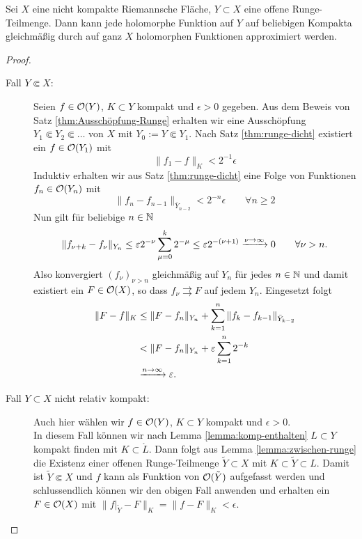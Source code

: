\begin{thm}
  \label{thm:runge}
  Sei $X$ eine nicht kompakte Riemannsche Fläche, $Y \subset X$ eine
  offene Runge-Teilmenge.
  Dann kann jede holomorphe Funktion auf $Y$ auf beliebigen Kompakta
  gleichmäßig durch auf ganz $X$ holomorphen Funktionen approximiert werden.
\end{thm}

\begin{proof}
  \begin{description}
  \item[Fall $Y \Subset X$:] Seien $f \in \mathcal{O}(Y)$, $K \subset Y$
    kompakt und $\epsilon > 0$ gegeben. 
    Aus dem Beweis von Satz \ref{thm:Ausschöpfung-Runge} erhalten wir
    eine Ausschöpfung$Y_1
    \Subset Y_2 \Subset \dots$ von $X$ mit $Y_0 := Y \Subset Y_1$. 
    Nach Satz \ref{thm:runge-dicht} existiert ein $f \in \mathcal{O}(Y_1)$
    mit
    \[
    \|f_1 - f\|_K < 2^{-1} \epsilon
    \]
    Induktiv erhalten wir aus Satz \ref{thm:runge-dicht} eine Folge
    von Funktionen $f_n \in \mathcal{O}(Y_n)$ mit
    \[
    \|f_n - f_{n-1}\|_{\bar Y_{n-2}} < 2^{-n} \epsilon \qquad \forall
    n \geq 2
    \]
    Nun gilt für beliebige $n \in \mathbb{N}$
    \[
    \|f_{\nu + k} - f_{\nu} \|_{Y_n} \leq \varepsilon 2^{-\nu} \sum_{\mu
      = 0}^k 2^{-\mu} \leq  \varepsilon 2^{-(\nu+1)} \xrightarrow{\nu \rightarrow
      \infty} 0 \qquad \forall \nu > n.
    \]
    Also konvergiert $(f_\nu)_{\nu > n}$ gleichmäßig auf $Y_n$ für
    jedes $n \in \mathbb{N}$ und damit existiert ein $F \in \mathcal{O}(X)$, so dass
    $f_\nu \rightrightarrows F$ auf jedem $Y_n$. Eingesetzt folgt
    \begin{align*}
      \|F - f\|_K & \leq \|F - f_n\|_{Y_n} + \sum_{k=1}^n \|f_k -
      f_{k-1}\|_{\bar Y_{k-2}} \\
      & < \|F - f_n \|_{Y_n} + \varepsilon \sum_{k=1}^n 2^{-k} \\
      & \xrightarrow{n \rightarrow \infty} \varepsilon.
    \end{align*}
  \item[Fall $Y \subset X$ nicht relativ kompakt:] Auch hier wählen
    wir $f \in \mathcal{O}(Y)$, $K \subset Y$ kompakt und $\epsilon > 0$. \\
    In diesem Fall können wir nach Lemma \ref{lemma:komp-enthalten}  $L \subset Y$ kompakt finden mit $K \subset
    \mathring L$. Dann folgt aus Lemma \ref{lemma:zwischen-runge} die Existenz einer
    offenen Runge-Teilmenge
    $\tilde Y \subset X$ mit $K \subset \tilde Y \subset L$. 
    Damit ist $\tilde Y \Subset X$ und $f$ kann als Funktion von
    $\mathcal{O}(\tilde Y)$ aufgefasst werden und schlussendlich können wir
    den obigen Fall anwenden und erhalten ein $F \in \mathcal{O}(X)$ mit
    $\|f|_{\tilde Y} - F\|_K = \|f - F\|_K < \epsilon$.
  \end{description}
\end{proof}

